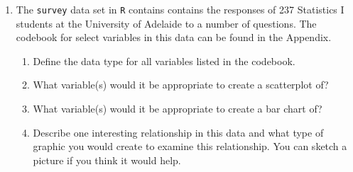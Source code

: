 \documentclass{article}\usepackage[]{graphicx}\usepackage[]{color}
\newcommand{\R}[1]{\texttt{#1}}
\begin{document}
\begin{enumerate}
\item The \R{survey} data set in \R{R} contains contains the responses of 237 Statistics I students at the University of Adelaide to a number of questions. The codebook for select variables in this data can be found in the Appendix.

  \begin{enumerate}
  \item Define the data type for all variables listed in the codebook. \vspace{3cm}

  \item What variable(s) would it be appropriate to create a scatterplot of? \vspace{3cm}

  \item What variable(s) would it be appropriate to create a bar chart of? \vspace{3cm}

  \item Describe one interesting relationship in this data and what type of graphic you would create to examine this relationship. You can sketch a picture if you think it would help.
  \end{enumerate}



\end{enumerate}
\end{document}

